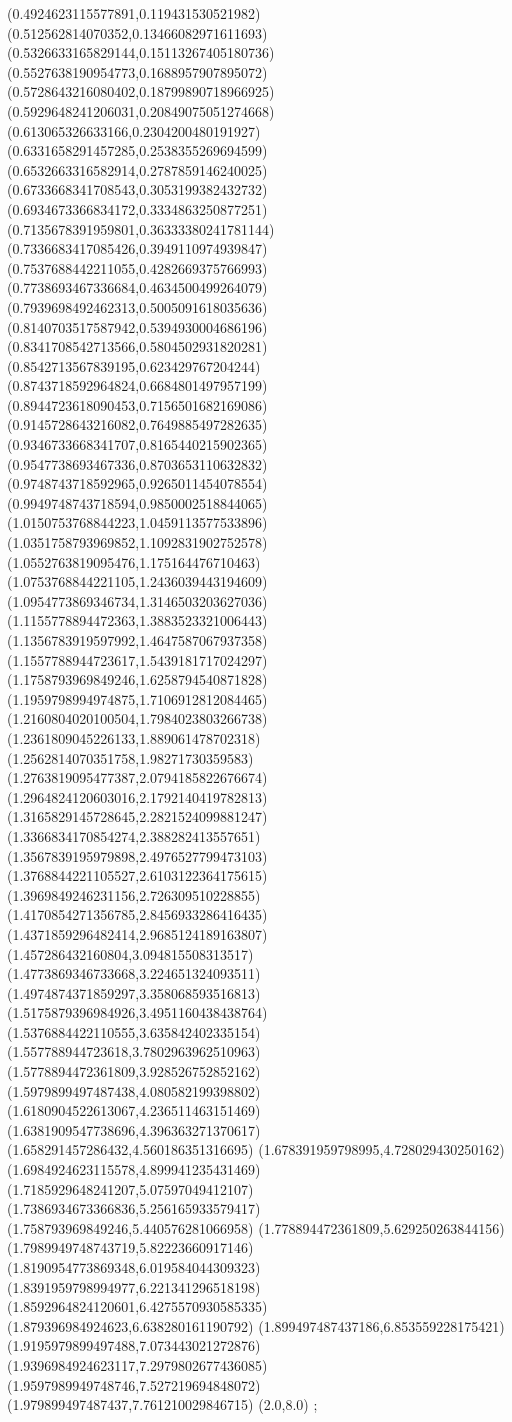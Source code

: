 {(0.4924623115577891,0.119431530521982)
(0.512562814070352,0.13466082971611693)
(0.5326633165829144,0.15113267405180736)
(0.5527638190954773,0.1688957907895072)
(0.5728643216080402,0.18799890718966925)
(0.5929648241206031,0.20849075051274668)
(0.613065326633166,0.2304200480191927)
(0.6331658291457285,0.2538355269694599)
(0.6532663316582914,0.2787859146240025)
(0.6733668341708543,0.3053199382432732)
(0.6934673366834172,0.3334863250877251)
(0.7135678391959801,0.36333380241781144)
(0.7336683417085426,0.3949110974939847)
(0.7537688442211055,0.4282669375766993)
(0.7738693467336684,0.4634500499264079)
(0.7939698492462313,0.5005091618035636)
(0.8140703517587942,0.5394930004686196)
(0.8341708542713566,0.5804502931820281)
(0.8542713567839195,0.623429767204244)
(0.8743718592964824,0.6684801497957199)
(0.8944723618090453,0.7156501682169086)
(0.9145728643216082,0.7649885497282635)
(0.9346733668341707,0.8165440215902365)
(0.9547738693467336,0.8703653110632832)
(0.9748743718592965,0.9265011454078554)
(0.9949748743718594,0.9850002518844065)
(1.0150753768844223,1.0459113577533896)
(1.0351758793969852,1.1092831902752578)
(1.0552763819095476,1.175164476710463)
(1.0753768844221105,1.2436039443194609)
(1.0954773869346734,1.3146503203627036)
(1.1155778894472363,1.3883523321006443)
(1.1356783919597992,1.4647587067937358)
(1.1557788944723617,1.5439181717024297)
(1.1758793969849246,1.6258794540871828)
(1.1959798994974875,1.7106912812084465)
(1.2160804020100504,1.7984023803266738)
(1.2361809045226133,1.889061478702318)
(1.2562814070351758,1.98271730359583)
(1.2763819095477387,2.0794185822676674)
(1.2964824120603016,2.1792140419782813)
(1.3165829145728645,2.2821524099881247)
(1.3366834170854274,2.388282413557651)
(1.3567839195979898,2.4976527799473103)
(1.3768844221105527,2.6103122364175615)
(1.3969849246231156,2.726309510228855)
(1.4170854271356785,2.8456933286416435)
(1.4371859296482414,2.9685124189163807)
(1.457286432160804,3.094815508313517)
(1.4773869346733668,3.224651324093511)
(1.4974874371859297,3.358068593516813)
(1.5175879396984926,3.4951160438438764)
(1.5376884422110555,3.635842402335154)
(1.557788944723618,3.7802963962510963)
(1.5778894472361809,3.928526752852162)
(1.5979899497487438,4.080582199398802)
(1.6180904522613067,4.236511463151469)
(1.6381909547738696,4.396363271370617)
(1.658291457286432,4.560186351316695)
(1.678391959798995,4.728029430250162)
(1.6984924623115578,4.899941235431469)
(1.7185929648241207,5.07597049412107)
(1.7386934673366836,5.256165933579417)
(1.758793969849246,5.440576281066958)
(1.778894472361809,5.629250263844156)
(1.7989949748743719,5.82223660917146)
(1.8190954773869348,6.019584044309323)
(1.8391959798994977,6.221341296518198)
(1.8592964824120601,6.4275570930585335)
(1.879396984924623,6.638280161190792)
(1.899497487437186,6.853559228175421)
(1.9195979899497488,7.073443021272876)
(1.9396984924623117,7.2979802677436085)
(1.9597989949748746,7.527219694848072)
(1.979899497487437,7.761210029846715)
(2.0,8.0)
};
